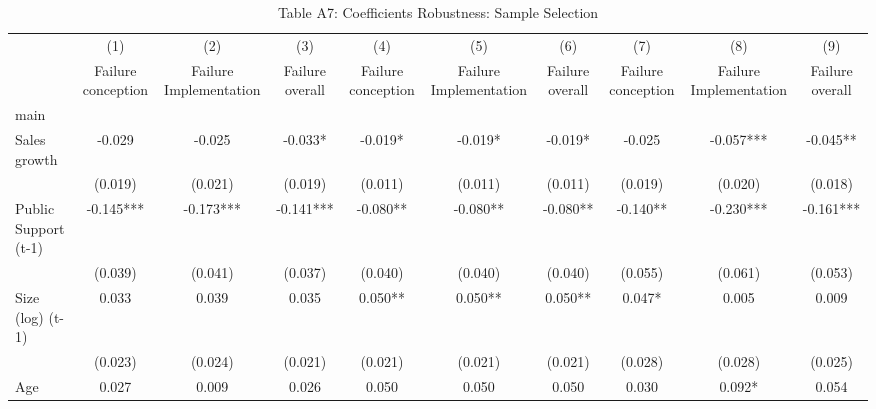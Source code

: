 \begin{table}[htbp]\centering
\def\sym#1{\ifmmode^{#1}\else\(^{#1}\)\fi}
\caption{{Table A7: Coefficients Robustness: Sample Selection}}
\begin{tabular}{l*{9}{c}}
\hline\hline
                    &\multicolumn{1}{c}{(1)}&\multicolumn{1}{c}{(2)}&\multicolumn{1}{c}{(3)}&\multicolumn{1}{c}{(4)}&\multicolumn{1}{c}{(5)}&\multicolumn{1}{c}{(6)}&\multicolumn{1}{c}{(7)}&\multicolumn{1}{c}{(8)}&\multicolumn{1}{c}{(9)}\\
                    &\multicolumn{1}{c}{Failure conception}&\multicolumn{1}{c}{Failure Implementation}&\multicolumn{1}{c}{Failure overall}&\multicolumn{1}{c}{Failure conception}&\multicolumn{1}{c}{Failure Implementation}&\multicolumn{1}{c}{Failure overall}&\multicolumn{1}{c}{Failure conception}&\multicolumn{1}{c}{Failure Implementation}&\multicolumn{1}{c}{Failure overall}\\
\hline
main                &               &               &               &               &               &               &               &               &               \\
Sales growth        &      -0.029   &      -0.025   &      -0.033*  &      -0.019*  &      -0.019*  &      -0.019*  &      -0.025   &      -0.057***&      -0.045** \\
                    &     (0.019)   &     (0.021)   &     (0.019)   &     (0.011)   &     (0.011)   &     (0.011)   &     (0.019)   &     (0.020)   &     (0.018)   \\
Public Support (t-1)&      -0.145***&      -0.173***&      -0.141***&      -0.080** &      -0.080** &      -0.080** &      -0.140** &      -0.230***&      -0.161***\\
                    &     (0.039)   &     (0.041)   &     (0.037)   &     (0.040)   &     (0.040)   &     (0.040)   &     (0.055)   &     (0.061)   &     (0.053)   \\
Size (log) (t-1)    &       0.033   &       0.039   &       0.035   &       0.050** &       0.050** &       0.050** &       0.047*  &       0.005   &       0.009   \\
                    &     (0.023)   &     (0.024)   &     (0.021)   &     (0.021)   &     (0.021)   &     (0.021)   &     (0.028)   &     (0.028)   &     (0.025)   \\
Age                 &       0.027   &       0.009   &       0.026   &       0.050   &       0.050   &       0.050   &       0.030   &       0.092*  &       0.054   \\

\end{tabular}
\end{table}
